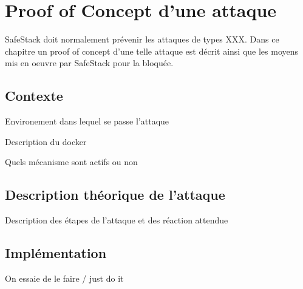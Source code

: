 \chapter{Proof of Concept d'une attaque}
\label{chap:attaque}

SafeStack doit normalement prévenir les attaques de types XXX. Dans ce chapitre un proof of concept d'une telle attaque est décrit ainsi que les moyens mis en oeuvre par SafeStack pour la bloquée.

\minitoc

\newpage

\section{Contexte}

Environement dans lequel se passe l'attaque

Description du docker

Quels mécanisme sont actifs ou non

\section{Description théorique de l'attaque}

Description des étapes de l'attaque et des réaction attendue

\section{Implémentation}

On essaie de le faire / just do it
